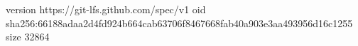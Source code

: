 version https://git-lfs.github.com/spec/v1
oid sha256:66188adaa2d4fd924b664cab63706f8467668fab40a903e3aa493956d16c1255
size 32864
